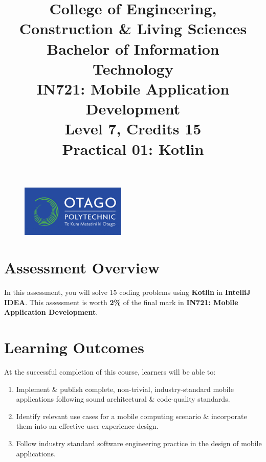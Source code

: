 \documentclass{article}
\author{}
\begin{document}
\begin{figure}
    \centering
    \includegraphics[width=50mm]{./img/logo.png}
\end{figure}

\title{College of Engineering, Construction \& Living Sciences\\Bachelor of Information Technology\\IN721: Mobile Application Development\\Level 7, Credits 15\\\textbf{Practical 01: Kotlin}}
\date{}
\maketitle

\section*{Assessment Overview}
In this assessment, you will solve 15 coding problems using \textbf{Kotlin} in \textbf{IntelliJ IDEA}. This assessment is worth \textbf{2\%} of the final mark in \textbf{IN721: Mobile Application Development}.

\section*{Learning Outcomes}
At the successful completion of this course, learners will be able to: 
\begin{enumerate}
	\item Implement \& publish complete, non-trivial, industry-standard mobile applications following sound architectural \& code-quality standards.
	\item Identify relevant use cases for a mobile computing scenario \& incorporate them into an effective user experience design.
	\item Follow industry standard software engineering practice in the design of mobile applications.
\end{enumerate} 
\end{document}
